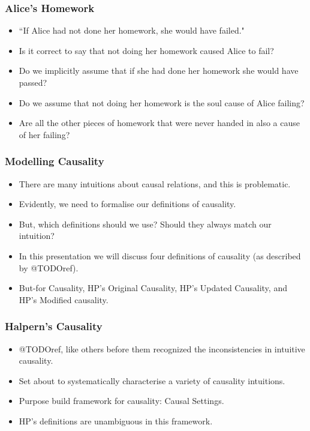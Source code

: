 \documentclass{beamer}
\theoremstyle{plain}
\theoremstyle{definition}
\begin{document}
\begin{frame}
\frametitle{Alice's Homework}
\begin{itemize}
\item ``If Alice had not done her homework, she would have failed."
\item Is it correct to say that not doing her homework caused Alice to fail?
\item Do we implicitly assume that if she had done her homework she would have passed?
\item Do we assume that not doing her homework is the soul cause of Alice failing?
\item Are all the other pieces of homework that were never handed in also a cause of her failing?
\end{itemize}

\end{frame}




\begin{frame}
\frametitle{Modelling Causality}
\begin{itemize}
\item There are many intuitions about causal relations, and this is problematic.
\item Evidently, we need to formalise our definitions of causality.
\item But, which definitions should we use? Should they always match our intuition?
\item In this presentation we will discuss four definitions of causality (as described by @TODOref).
\item But-for Causality, HP's Original Causality, HP's Updated Causality, and HP's Modified causality.
\end{itemize}

\end{frame}



\begin{frame}
\frametitle{Halpern's Causality}

\begin{itemize}
\item @TODOref, like others before them recognized the inconsistencies in intuitive causality.
\item Set about to systematically characterise a variety of causality intuitions.
\item Purpose build framework for causality: Causal Settings.
\item HP's definitions are unambiguous in this framework.
\end{itemize}

\end{frame}
\end{document}
